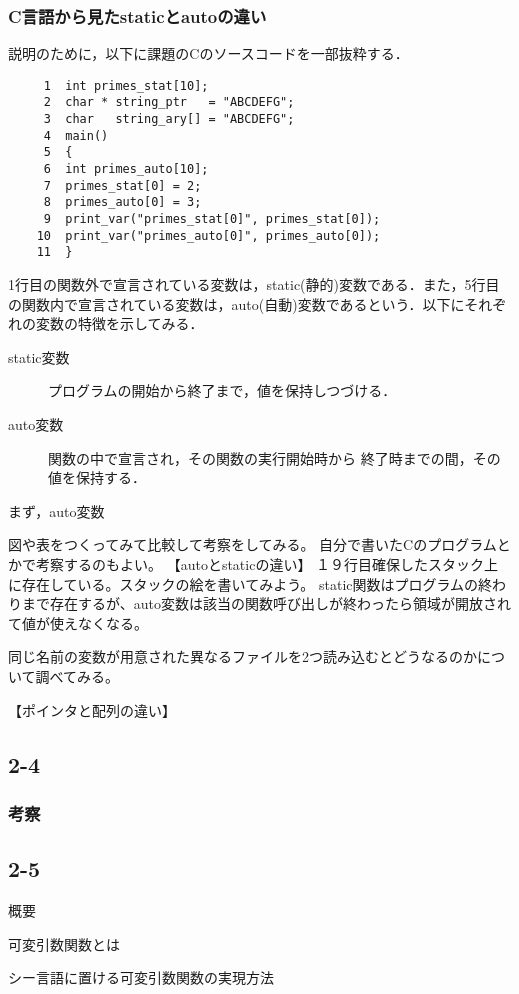 \documentclass[a4j,11pt]{jarticle}
\begin{document}
  \subsubsection{C言語から見たstaticとautoの違い}
説明のために，以下に課題のCのソースコードを一部抜粋する．
\begin{verbatim}
     1	int primes_stat[10]; 
     2	char * string_ptr   = "ABCDEFG";
     3	char   string_ary[] = "ABCDEFG";
     4	main()
     5	{
     6	int primes_auto[10];
     7	primes_stat[0] = 2;
     8	primes_auto[0] = 3;
     9	print_var("primes_stat[0]", primes_stat[0]);
    10	print_var("primes_auto[0]", primes_auto[0]);
    11	}
\end{verbatim}
1行目の関数外で宣言されている変数は，static(静的)変数である．また，5行目の関数内で宣言されている変数は，auto(自動)変数であるという．以下にそれぞれの変数の特徴を示してみる．
\begin{description}
\item[static変数]プログラムの開始から終了まで，値を保持しつづける．
\item[auto変数]関数の中で宣言され，その関数の実行開始時から 終了時までの間，その値を保持する．
\end{description}
まず，auto変数

図や表をつくってみて比較して考察をしてみる。
自分で書いたCのプログラムとかで考察するのもよい。
【autoとstaticの違い】
１９行目確保したスタック上に存在している。スタックの絵を書いてみよう。
static関数はプログラムの終わりまで存在するが、auto変数は該当の関数呼び出しが終わったら領域が開放されて値が使えなくなる。

同じ名前の変数が用意された異なるファイルを2つ読み込むとどうなるのかについて調べてみる。


【ポインタと配列の違い】

 \subsection{2-4}

  \subsubsection{考察}

 \subsection{2-5}
概要

可変引数関数とは

シー言語に置ける可変引数関数の実現方法
\end{document}
